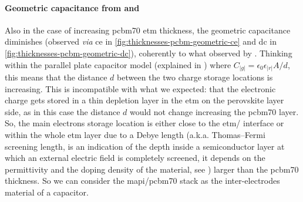 	\paragraph{Geometric capacitance from  and }
	Also in the case of increasing \gls{pcbm70} \gls{etm} thickness, the geometric capacitance diminishes (observed \textsl{via} \gls{ce} in \cref{fig:thicknesses-pcbm-geometric-ce} and \gls{dc} in \cref{fig:thicknesses-pcbm-geometric-dc}), coherently to what observed by .
	Thinking within the parallel plate capacitor model (explained in ) where $C_|g| = \epsilon_0 \epsilon_|r| A / d$, this means that the distance $d$ between the two charge storage locations is increasing.
	This is incompatible with what we expected: that the electronic charge gets stored in a thin depletion layer in the \gls{etm} on the perovskite layer side, as in this case the distance $d$ would not change increasing the \gls{pcbm70} layer.
	So, the main electrons storage location is either close to the \gls{etm}\-/ interface or within the whole \gls{etm} layer due to a Debye length (a.k.a. Thomas–Fermi screening length, is an indication of the depth inside a semiconductor layer at which an external electric field is completely screened, it depends on the permittivity and the doping density of the material, see ) larger than the \gls{pcbm70} thickness.
	So we can consider the \gls{mapi}\-/\gls{pcbm70} stack as the inter\hyp{}electrodes material of a capacitor.


